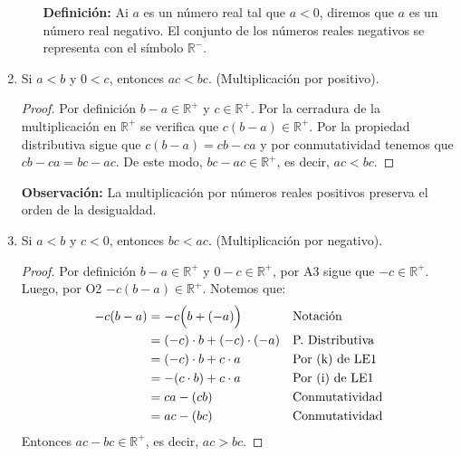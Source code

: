 \documentclass[11pt]{article}
\newcommand{\R}{\mathbb{R}}
\let\set\Set
\begin{document}
\begin{enumerate}[label=\alph*)]
\begin{enumerate}[label=\roman*)]
        \textbf{Definición:} Ai $a$ es un número real tal que $a<0$, diremos que $a$ es un número real negativo. El conjunto de los números reales negativos se representa con el símbolo $\R^-$.
    \end{enumerate} %

    \item Si $a<b$ y $0<c$, entonces $ac<bc$. (Multiplicación por positivo).
    
    \vspace{-1em}\begin{proof} 
        Por definición $b-a \in \R^+$ y $c \in \R^+$. Por la cerradura de la multiplicación en $\R^+$ se verifica que $c(b-a) \in \R^+$. Por la propiedad distributiva sigue que $c(b-a)=cb-ca$ y por conmutatividad tenemos que $cb-ca=bc-ac$. De este modo, $bc-ac \in \R^+$, es decir, $ac<bc$.    
    \end{proof} \vspace{-1em}

    \textbf{Observación:} La multiplicación por números reales positivos preserva el orden de la desigualdad.

    \item Si $a<b$ y $c<0$, entonces $bc<ac$. (Multiplicación por negativo).
    
    \vspace{-1em}\begin{proof} 
        Por definición $b-a \in \R^+$ y $0 - c \in \R^+$, por A3 sigue que $ -c \in \R^+$. Luego, por O2 $-c(b-a) \in \R^+$. Notemos que:
    \begin{align*}
    -c(b-a) &= -c \Bigl( b + (-a) \Bigr) && \text{Notación}\\
    &= (-c) \cdot b + (-c) \cdot (-a) && \text{P. Distributiva}\\
    &= (-c) \cdot b + c \cdot a && \text{Por (k) de LE1}\\
    &= -(c \cdot b) + c \cdot a && \text{Por (i) de LE1}\\
    &= ca -(cb) && \text{Conmutatividad}\\
    &= ac - (bc) && \text{Conmutatividad}
    \end{align*}
    Entonces $ac - bc \in \R^+$, es decir, $ac>bc$.    
    \end{proof} \vspace{-1em}


\end{enumerate}
\end{document}
